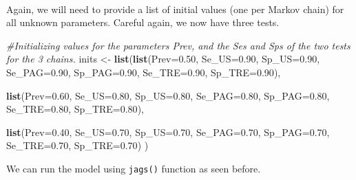 \documentclass[
]{book}
\newenvironment{Shaded}{\begin{snugshade}}{\end{snugshade}}
\newcommand{\AttributeTok}[1]{\textcolor[rgb]{0.13,0.29,0.53}{#1}}
\newcommand{\CommentTok}[1]{\textcolor[rgb]{0.56,0.35,0.01}{\textit{#1}}}
\newcommand{\FloatTok}[1]{\textcolor[rgb]{0.00,0.00,0.81}{#1}}
\newcommand{\FunctionTok}[1]{\textcolor[rgb]{0.13,0.29,0.53}{\textbf{#1}}}
\newcommand{\NormalTok}[1]{#1}
\newcommand{\OtherTok}[1]{\textcolor[rgb]{0.56,0.35,0.01}{#1}}
\begin{document}
\strut \\
Again, we will need to provide a list of initial values (one per Markov chain) for all unknown parameters. Careful again, we now have three tests.

\begin{Shaded}
\begin{Highlighting}[]
\CommentTok{\#Initializing values for the parameters Prev, and the Ses and Sps of the two tests for the 3 chains.}
\NormalTok{inits }\OtherTok{\textless{}{-}} \FunctionTok{list}\NormalTok{(}\FunctionTok{list}\NormalTok{(}\AttributeTok{Prev=}\FloatTok{0.50}\NormalTok{,}
              \AttributeTok{Se\_US=}\FloatTok{0.90}\NormalTok{,}
              \AttributeTok{Sp\_US=}\FloatTok{0.90}\NormalTok{,}
              \AttributeTok{Se\_PAG=}\FloatTok{0.90}\NormalTok{,}
              \AttributeTok{Sp\_PAG=}\FloatTok{0.90}\NormalTok{,}
              \AttributeTok{Se\_TRE=}\FloatTok{0.90}\NormalTok{,}
              \AttributeTok{Sp\_TRE=}\FloatTok{0.90}\NormalTok{),}
              
              \FunctionTok{list}\NormalTok{(}\AttributeTok{Prev=}\FloatTok{0.60}\NormalTok{,}
              \AttributeTok{Se\_US=}\FloatTok{0.80}\NormalTok{,}
              \AttributeTok{Sp\_US=}\FloatTok{0.80}\NormalTok{,}
              \AttributeTok{Se\_PAG=}\FloatTok{0.80}\NormalTok{,}
              \AttributeTok{Sp\_PAG=}\FloatTok{0.80}\NormalTok{,}
              \AttributeTok{Se\_TRE=}\FloatTok{0.80}\NormalTok{,}
              \AttributeTok{Sp\_TRE=}\FloatTok{0.80}\NormalTok{),}
              
              \FunctionTok{list}\NormalTok{(}\AttributeTok{Prev=}\FloatTok{0.40}\NormalTok{,}
              \AttributeTok{Se\_US=}\FloatTok{0.70}\NormalTok{,}
              \AttributeTok{Sp\_US=}\FloatTok{0.70}\NormalTok{,}
              \AttributeTok{Se\_PAG=}\FloatTok{0.70}\NormalTok{,}
              \AttributeTok{Sp\_PAG=}\FloatTok{0.70}\NormalTok{,}
              \AttributeTok{Se\_TRE=}\FloatTok{0.70}\NormalTok{,}
              \AttributeTok{Sp\_TRE=}\FloatTok{0.70}\NormalTok{)}
\NormalTok{              )}
\end{Highlighting}
\end{Shaded}

We can run the model using \texttt{jags()} function as seen before.
\end{document}
